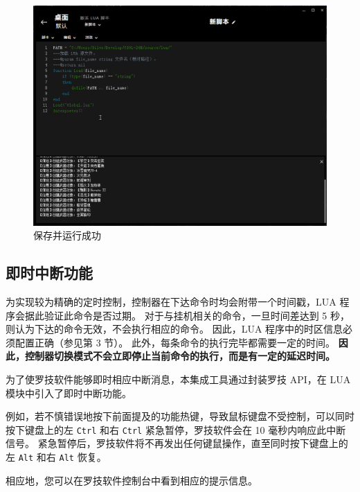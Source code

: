 \begin{figure}[H]
    \Centering
    \includegraphics[width=\textwidth]{docs/assets/success.png}
    \caption{保存并运行成功}
\end{figure}

\subsection{即时中断功能}

为实现较为精确的定时控制，控制器在下达命令时均会附带一个时间戳，LUA 程序会据此验证此命令是否过期。
对于与挂机相关的命令，一旦时间差达到 5 秒，则认为下达的命令无效，不会执行相应的命令。
因此，LUA 程序中的时区信息必须配置正确（参见第 3 节）。
此外，每条命令的执行完毕都需要一定的时间。
\textbf{因此，控制器切换模式不会立即停止当前命令的执行，而是有一定的延迟时间。}

为了使罗技软件能够即时相应中断消息，本集成工具通过封装罗技 API，在 LUA 模块中引入了即时中断功能。

例如，若不慎错误地按下前面提及的功能热键，导致鼠标键盘不受控制，可以同时按下键盘上的左 \lstinline{Ctrl} 和右 \lstinline{Ctrl} 紧急暂停，罗技软件会在 10 毫秒内响应此中断信号。
紧急暂停后，罗技软件将不再发出任何键鼠操作，直至同时按下键盘上的左 \lstinline{Alt} 和右 \lstinline{Alt} 恢复。

相应地，您可以在罗技软件控制台中看到相应的提示信息。

